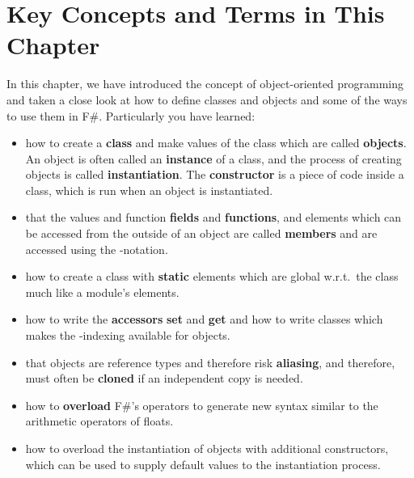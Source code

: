 \documentclass[fsharpNotes.tex]{subfiles}
\begin{document}
\section{Key Concepts and Terms in This Chapter}
In this chapter, we have introduced the concept of object-oriented programming and taken a close look at how to define classes and objects and some of the ways to use them in F\#. Particularly you have learned:
\begin{itemize}
\item how to create a \textbf{class} and make values of the class which are called \textbf{objects}. An object is often called an \textbf{instance} of a class, and the process of creating objects is called \textbf{instantiation}. The \textbf{constructor} is a piece of code inside a class, which is run when an object is instantiated.
\item that the values and function \textbf{fields} and \textbf{functions}, and elements which can be accessed from the outside of an object are called \textbf{members} and are accessed using the -notation.
\item how to create a class with \textbf{static} elements which are global w.r.t.\ the class much like a module's elements.
\item how to write the \textbf{accessors} \textbf{set} and \textbf{get} and how to write classes which makes the \lexeme{[]}-indexing available for objects.
\item that objects are reference types and therefore risk \textbf{aliasing}, and therefore, must often be \textbf{cloned} if an independent copy is needed.
\item how to \textbf{overload} F\#'s operators to generate new syntax similar to the arithmetic operators of floats.
\item how to overload the instantiation of objects with additional constructors, which can be used to supply default values to the instantiation process.
\end{itemize}
\end{document}
